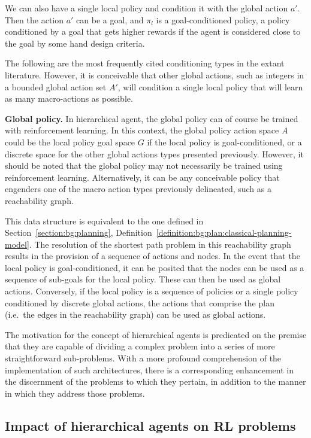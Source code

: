 We can also have a single local policy and condition it with the global action $a'$.
Then the action $a'$ can be a goal, and $\pi_l$ is a goal-conditioned policy, a policy conditioned by a goal that gets
higher rewards if the agent is considered close to the goal by some hand design criteria.

The following are the most frequently cited conditioning types in the extant literature.
However, it is conceivable that other global actions, such as integers in a bounded global action set $A'$, will
condition a single local policy that will learn as many macro-actions as possible.

\textbf{Global policy.} In hierarchical agent, the global policy can of course be trained with reinforcement learning.
In this context, the global policy action space $A$ could be the local policy goal space $G$ if the local policy is
goal-conditioned, or a discrete space for the other global actions types presented previously.
However, it should be noted that the global policy may not necessarily be trained using reinforcement learning.
Alternatively, it can be any conceivable policy that engenders one of the macro action types previously delineated,
such as a reachability graph.

This data structure is equivalent to the one defined in Section~\ref{section:bg:planning},
Definition~\ref{definition:bg:plan:classical-planning-model}.
The resolution of the shortest path problem in this reachability graph results in the provision of a sequence of
actions and nodes.
In the event that the local policy is goal-conditioned, it can be posited that the nodes can be used as a sequence of
sub-goals for the local policy.
These can then be used as global actions.
Conversely, if the local policy is a sequence of policies or a single policy conditioned by discrete global actions,
the actions that comprise the plan (i.e.\ the edges in the reachability graph) can be used as global actions.

The motivation for the concept of hierarchical agents is predicated on the premise that they are capable of dividing a
complex problem into a series of more straightforward sub-problems.
With a more profound comprehension of the implementation of such architectures, there is a corresponding enhancement in
the discernment of the problems to which they pertain, in addition to the manner in which they address those problems.

\subsection{Impact of hierarchical agents on RL problems}\label{subsection:bg:plan-rl:impact-on-rl-problems}


